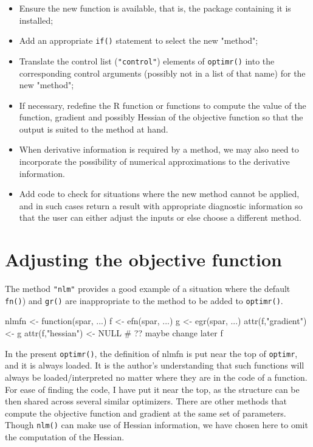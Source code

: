 \documentclass[10pt]{article}
\let\code=\texttt
\let\proglang=\textsf
\begin{document}
\begin{itemize}
\item Ensure the new function is available, that is, the package containing it
is installed;
\item Add an appropriate \code{if()} statement to select the new "method";
\item Translate the control list (\code{"control"}) elements of \code{optimr()}
into the corresponding control arguments (possibly not in a list of that name)
for the new "method";
\item If necessary, redefine the \proglang{R} function or functions to compute the 
value of the function, gradient and possibly Hessian of the objective function
so that the output is suited to the method at hand.
\item When derivative information is required by a method, we may also 
need to incorporate the possibility of numerical 
approximations to the derivative information. 
\item Add code to check for situations where the new method cannot be applied, and
in such cases return a result with appropriate diagnostic information so that the
user can either adjust the inputs or else choose a different method.
\end{itemize}


\section{Adjusting the objective function}

The method \code{"nlm"} provides a good example of a situation where the default
\code{fn()}) and \code{gr()} are inappropriate to the method to be added to \code{optimr()}.

\begin{Schunk}
\begin{Sinput}
  nlmfn <- function(spar, ...){
     f <- efn(spar, ...)
     g <- egr(spar, ...)
     attr(f,"gradient") <- g
     attr(f,"hessian") <- NULL # ?? maybe change later
     f
  }
\end{Sinput}
\end{Schunk}

In the present \code{optimr()}, the definition of nlmfn is put near the top of 
\code{optimr}, and it is always loaded. It is the author's understanding that such
functions will always be loaded/interpreted no matter where they are in the 
code of a function. For ease of finding the code, I have put it near the top, as
the structure can be then shared across several similar optimizers. There are 
other methods that compute the objective function and gradient at the same set of
parameters. Though \code{nlm()} can make use of Hessian information, we have chosen
here to omit the computation of the Hessian. 
\end{document}
